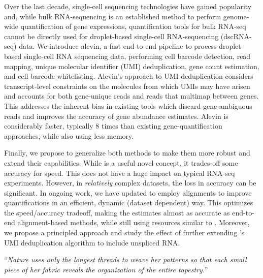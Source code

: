 \documentclass[
12pt, %
oneside, %
english, %
singlespacing, %
liststotoc, %
parskip, %
headsepline, %
]{main} %
\begin{document}
Over the last decade, single-cell sequencing technologies have gained popularity and,
while bulk RNA-sequencing is an established method to perform genome-wide quantification of gene 
expressions, quantification tools for bulk RNA-seq cannot be directly used for 
droplet-based single-cell RNA-sequencing (dscRNA-seq) data. We introduce alevin, a fast 
end-to-end pipeline to process droplet-based single-cell RNA sequencing data, performing 
cell barcode detection, read mapping, unique molecular identifier (UMI) deduplication, 
gene count estimation, and cell barcode whitelisting. Alevin’s approach to UMI deduplication 
considers transcript-level constraints on the molecules from which UMIs may have arisen and 
accounts for both gene-unique reads and reads that multimap between genes. This addresses 
the inherent bias in existing tools which discard gene-ambiguous reads and improves the 
accuracy of gene abundance estimates. Alevin is considerably faster, typically 8 times  
than existing gene-quantification approaches, while also using less memory.

Finally, we propose to generalize both methods to make them more robust and extend their capabilities. 
While \qm is a useful novel concept, it trades-off some accuracy for speed. This does not have a huge
impact on typical RNA-seq experiments. However, in \textit{relatively} complex datasets, the loss in accuracy 
can be significant. In ongoing work, we have updated \rapmap to employ alignments to improve 
quantifications in an efficient, dynamic (dataset dependent) way. This optimizes the
speed/accuracy tradeoff, making the estimates almost as accurate as end-to-end alignment-based
methods, while still using resources similar to \rapmap. Moreover, we propose a principled approach and 
study the effect of further extending \alevin's UMI deduplication algorithm to include unspliced RNA.
\newpage



\vspace*{0.2\textheight}

\noindent\enquote{\itshape Nature uses only the longest threads to weave her patterns so that each small piece of her fabric reveals the organization of the entire tapestry.}\bigbreak
\end{document}
